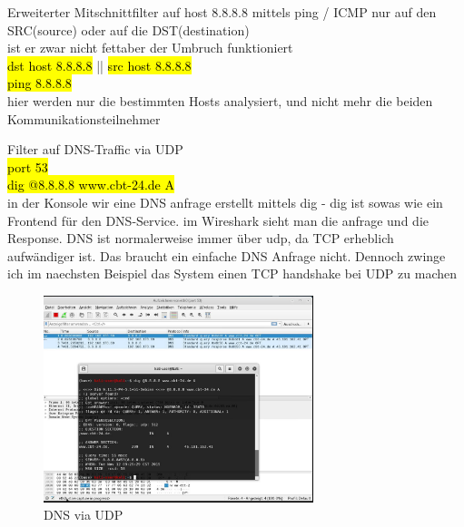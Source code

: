 \documentclass[]{article}
\begin{document}
\begin{description}
	\item Erweiterter Mitschnittfilter auf host 8.8.8.8 mittels ping / ICMP nur auf den SRC(source) oder auf die DST(destination)  \\ 
	ist er zwar nicht fettaber der Umbruch funktioniert\\
	{\hl{dst host 8.8.8.8}} || {\hl{src host 8.8.8.8}} \\
	{\hl{ping 8.8.8.8}} \\ 
	hier werden nur die bestimmten Hosts analysiert, und nicht mehr die beiden Kommunikationsteilnehmer
\newpage	
	\item Filter auf DNS-Traffic via UDP   \\ 
	{\hl{port 53}} \\
	{\hl{dig @8.8.8.8 www.cbt-24.de A}} \\ 
	in der Konsole wir eine DNS anfrage erstellt mittels dig - dig ist sowas wie ein Frontend für den DNS-Service. im Wireshark sieht man die anfrage und die Response. DNS ist normalerweise immer über udp, da TCP erheblich aufwändiger ist. Das braucht ein einfache DNS Anfrage nicht. Dennoch zwinge ich im naechsten Beispiel das System einen TCP  handshake bei UDP zu machen\\
	
	\begin{figure}[htbp] 
		\centering
		\includegraphics[width=0.7\textwidth]{./imgs/Picture3-Dig-DNS.JPG}
		\caption{DNS via UDP}
		\label{fig:Bild2}
		
	\end{figure}


\end{description}
\end{document}
